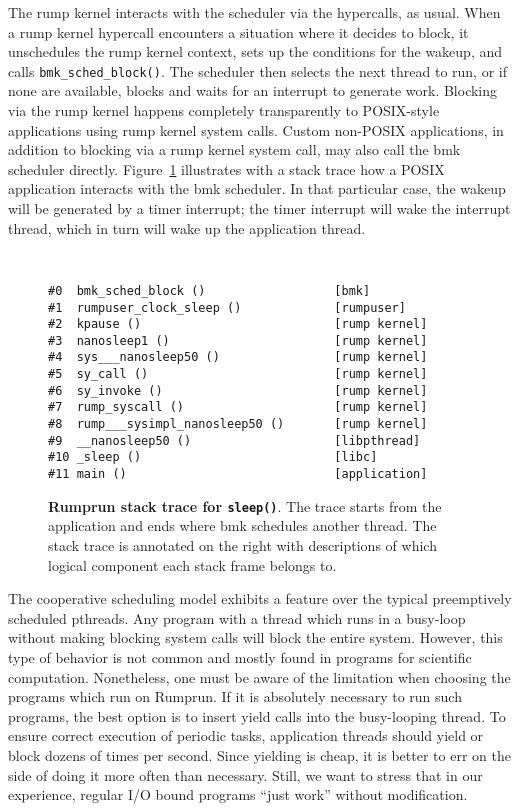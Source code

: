 The rump kernel interacts with the scheduler via the hypercalls, as usual.
When a rump kernel hypercall encounters a situation where it decides to block,
it unschedules the rump kernel context, sets up the conditions for the
wakeup, and calls \verb+bmk_sched_block()+.  The scheduler then selects
the next thread to run, or if none are available, blocks and waits for
an interrupt to generate work.  Blocking via the rump kernel happens
completely transparently to POSIX-style applications using rump kernel
system calls.  Custom non-POSIX applications, in addition to blocking
via a rump kernel system call, may also call the bmk scheduler directly.
Figure~\ref{fig:bmkblock} illustrates with a stack trace how a POSIX
application interacts with the bmk scheduler.  In that particular case,
the wakeup will be generated by a timer interrupt; the timer interrupt
will wake the interrupt thread, which in turn will wake up the application
thread.

\begin{figure}[t]
{\tt \scriptsize
\begin{verbatim}
#0  bmk_sched_block ()                  [bmk]
#1  rumpuser_clock_sleep ()             [rumpuser]
#2  kpause ()                           [rump kernel]
#3  nanosleep1 ()                       [rump kernel]
#4  sys___nanosleep50 ()                [rump kernel]
#5  sy_call ()                          [rump kernel]
#6  sy_invoke ()                        [rump kernel]
#7  rump_syscall ()                     [rump kernel]
#8  rump___sysimpl_nanosleep50 ()       [rump kernel]
#9  __nanosleep50 ()                    [libpthread]
#10 _sleep ()                           [libc]
#11 main ()                             [application]
\end{verbatim}}
\caption[Rumprun stack trace for \texttt{sleep()}]
{\textbf{Rumprun stack trace for \texttt{sleep()}}.
The trace starts from the application and ends where bmk schedules
another thread.  The stack trace is annotated on the right with
descriptions of which logical component each stack frame belongs to.
}
\label{fig:bmkblock}
\end{figure}

The cooperative scheduling model exhibits a feature over the typical
preemptively scheduled pthreads.  Any program with a thread which runs
in a busy-loop without making blocking system calls will block the
entire system.  However, this type of behavior is not common and mostly
found in programs for scientific computation.  Nonetheless, one must be
aware of the limitation when choosing the programs which run on Rumprun.
If it is absolutely necessary to run such programs, the best option is
to insert yield calls into the busy-looping thread.  To ensure correct
execution of periodic tasks, application threads should yield or block
dozens of times per second.  Since yielding is cheap, it is better to
err on the side of doing it more often than necessary.  Still, we want
to stress that in our experience, regular I/O bound programs ``just work''
without modification.


